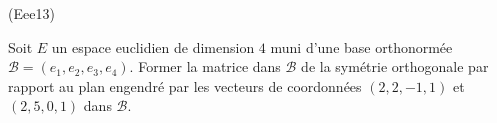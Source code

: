 \begin{tiny}(Eee13)\end{tiny} Soit $E$ un espace euclidien de dimension $4$ muni d'une base orthonormée $\mathcal{B}=(e_1,e_2,e_3,e_4)$. Former la matrice dans $\mathcal{B}$ de la symétrie orthogonale par rapport au plan engendré par les vecteurs de coordonnées $(2,2,-1,1)$ et $(2,5,0,1)$ dans $\mathcal{B}$.